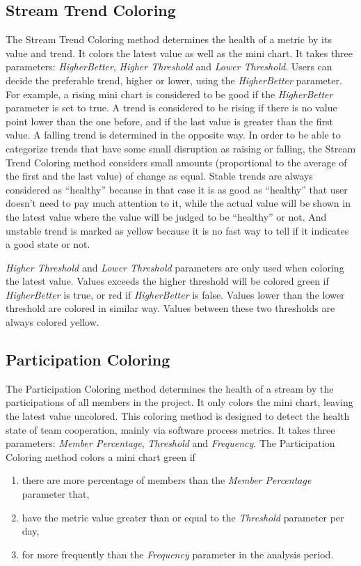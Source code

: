\subsection{Stream Trend Coloring} 
The Stream Trend Coloring method determines the health of a metric by its value and trend. It colors the latest value as well as the mini chart. It takes three parameters: {\it HigherBetter}, {\it Higher Threshold} and {\it Lower Threshold}. Users can decide the preferable trend, higher or lower, using the {\it HigherBetter} parameter. For example, a rising mini chart is considered to be good if the {\it HigherBetter} parameter is set to true. A trend is considered to be rising if there is no value point lower than the one before, and if the last value is greater than the first value. A falling trend is determined in the opposite way. In order to be able to categorize trends that have some small disruption as raising or falling, the Stream Trend Coloring method considers small amounts (proportional to the average of the first and the last value) of change as equal. Stable trends are always considered as ``healthy'' because in that case it is as good as ``healthy'' that user doesn't need to pay much attention to it, while the actual value will be shown in the latest value where the value will be judged to be ``healthy'' or not. And unstable trend is marked as yellow because it is no fast way to tell if it indicates a good state or not. 

{\it Higher Threshold} and {\it Lower Threshold} parameters are only used when coloring the latest value. Values exceeds the higher threshold will be colored green if {\it HigherBetter} is true, or red if {\it HigherBetter} is false. Values lower than the lower threshold are colored in similar way. Values between these two thresholds are always colored yellow.

\subsection{Participation Coloring}
The Participation Coloring method determines the health of a stream by the participations of all members in the project. It only colors the mini chart, leaving the latest value uncolored. This coloring method is designed to detect the health state of team cooperation, mainly via software process metrics. It takes three parameters: {\it Member Percentage}, {\it Threshold} and {\it Frequency}. The Participation Coloring method colors a mini chart green if 
\begin{enumerate}
\item there are more percentage of members than the {\it Member Percentage} parameter that,
\item have the metric value greater than or equal to the {\it Threshold} parameter per day,
\item for more frequently than the {\it Frequency} parameter in the analysis period.
\end{enumerate}

